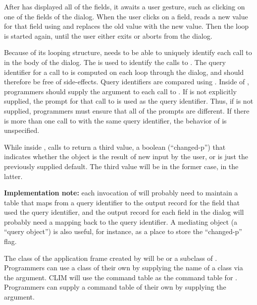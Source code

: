 After  has displayed all of the fields, it awaits a user
gesture, such as clicking on one of the fields of the dialog.  When the user
clicks on a field,  reads a new value for that field using
 and replaces the old value with the new value.  Then the loop is
started again, until the user either exits or aborts from the dialog.

Because of its looping structure,  needs to be able to
uniquely identify each call to  in the body of the dialog.  The
 is used to identify the calls to .  The
query identifier for a call to  is computed on each loop through the
dialog, and should therefore be free of side-effects.  Query identifiers are
compared using .  Inside of , programmers should
supply the  argument to each call to .  If
 is not explicitly supplied, the prompt for that call to
 is used as the query identifier.  Thus, if  is
not supplied, programmers must ensure that all of the prompts are different.  If
there is more than one call to  with the same query identifier, the
behavior of  is unspecified.  

While inside , calls to  return a third value, a
boolean (``changed-p'') that indicates whether the object is the result of new
input by the user, or is just the previously supplied default.  The third value
will be  in the former case,  in the latter.

{\bf Implementation note:} each invocation of  will
probably need to maintain a table that maps from a query identifier to the
output record for the field that used the query identifier, and the output
record for each field in the dialog will probably need a mapping back to the
query identifier.  A mediating object (a ``query object'') is also useful, for
instance, as a place to store the ``changed-p'' flag.

The class of the application frame created by  will be
 or a subclass of .  Programmers can use a
class of their own by supplying the name of a class via the 
argument.  CLIM will use the command table  as the command
table for .  Programmers can supply a command table of their
own by supplying the  argument.

